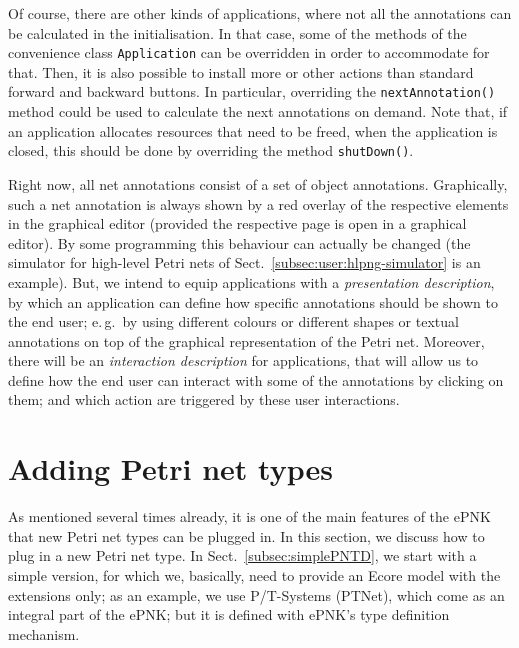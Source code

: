 Of course, there are other kinds of applications, where not all the annotations
can be calculated in the initialisation. In that case, some of the methods of
the convenience class {\tt Application} can be overridden in order to
accommodate for that. Then, it is also possible to install more or other actions
than standard forward and backward buttons. In particular, overriding the
{\tt nextAnnotation()} method could be used to calculate the next annotations on
demand. Note that, if an application allocates resources that need to be freed,
when the application is closed, this should be done by overriding the method
{\tt shutDown()}.%

Right now, all net annotations consist of a set of object annotations.
Graphically, such a net annotation is always shown by a red overlay of the respective
elements in the graphical editor (provided the respective page is open in a
graphical editor).
By some programming this behaviour can actually be changed (the simulator for
high-level Petri nets of Sect.~\ref{subsec:user:hlpng-simulator} is an example). But, we intend
to equip applications with a \emph{presentation description},%
by which an application can define how specific annotations should be shown to
the end user; e.\,g.\ by using different colours or different shapes or textual
annotations on top of the graphical representation of the Petri net. Moreover,
there will be an \emph{interaction description}%
for applications, that will allow us to define how the end user can interact
with some of the annotations by clicking on them; and which action are
triggered by these user interactions.


\section{Adding Petri net types}  
\label{sec:adding-types}

As mentioned several times already, it is one of the main features of the ePNK
that new Petri net types can be plugged in. In this section, we discuss how to
plug in a new Petri net type.  In Sect.~\ref{subsec:simplePNTD}, we start with a
simple version, for which we, basically, need to provide an Ecore model with
the extensions only; as an example, we use P/T-Systems (PTNet), which come as an
integral part of the ePNK; but it is defined with ePNK's type definition
mechanism.

